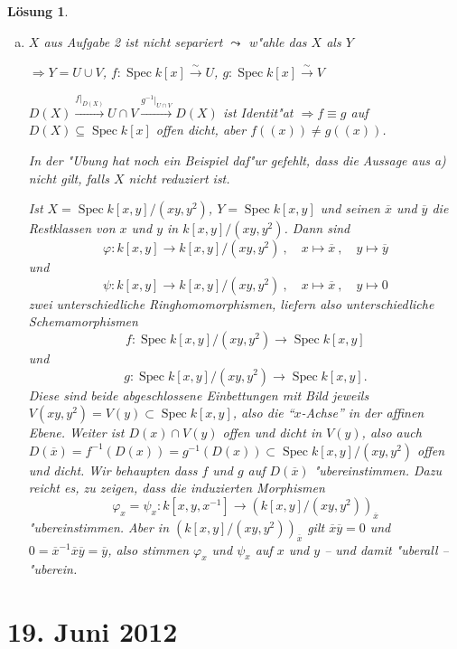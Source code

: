 \documentclass[paper = A4, fontsize=12pt, numbers=noendperiod, chapterprefix=true]{scrbook}
\theoremstyle{break}
\newtheorem{Loes}{L\"osung}
\theoremstyle{nonumberbreak}
\theoremstyle{nonumberplain}
\DeclareMathOperator{\Spec}{Spec}
\begin{document}
\begin{Loes}
\begin{enumerate}[a)]
	$\xRightarrow[\text{Aufg. 1}]{\text{Blatt 4}} \varphi(a) - \psi(a) \in \sqrt 0 \overset{B \text{ red.}}{=} \{0\}$
\item
	$X$ aus Aufgabe 2 ist nicht separiert $\leadsto$ w"ahle das $X$ als $Y$
	
	$\Rightarrow Y = U \cup V$, $f: \Spec k[x] \overset{\sim}{\to} U$, $g: \Spec k[x] \overset{\sim}{\to} V$
	
	$D(X) \xrightarrow{f|_{D(X)}} U \cap V \xrightarrow{g^{-1}|_{U \cap V}} D(X)$ ist Identit"at $\Rightarrow f \equiv g$ auf $D(X) \subseteq \Spec k[x]$ offen dicht, aber $f((x)) \ne g((x))$.
	
	In der "Ubung hat noch ein Beispiel daf"ur gefehlt, dass die Aussage aus a) nicht gilt, falls $X$ nicht reduziert ist.
	
	Ist $X = \Spec k[x,y]/(xy,y^2)$, $Y = \Spec k[x,y]$ und seinen $\overline{x}$ und $\overline{y}$ die Restklassen von $x$ und $y$ in $k[x,y]/(xy,y^2)$. Dann sind
		\[\varphi : k[x,y] \to k[x,y]/(xy,y^2)\ ,\quad x\mapsto \overline{x}\ ,\quad y\mapsto \overline{y}\]
	und
		\[\psi : k[x,y] \to k[x,y]/(xy,y^2)\ ,\quad x\mapsto \overline{x}\ ,\quad y\mapsto 0\]
	zwei unterschiedliche Ringhomomorphismen, liefern also unterschiedliche Schemamorphismen
		\[f: \Spec k[x,y]/(xy,y^2) \to \Spec k[x,y]\]
	und
		\[g: \Spec k[x,y]/(xy,y^2) \to \Spec k[x,y].\]
	Diese sind beide abgeschlossene Einbettungen mit Bild jeweils $V(xy,y^2) = V(y) \subset \Spec k[x,y]$, also die ``$x$-Achse'' in der affinen Ebene. Weiter ist $D(x) \cap V(y)$ offen und dicht in $V(y)$, also auch $D(\overline{x}) = f^{-1}(D(x)) = g^{-1}(D(x)) \subset \Spec k[x,y]/(xy,y^2)$ offen und dicht. Wir behaupten dass $f$ und $g$ auf $D(\overline{x})$ "ubereinstimmen. Dazu reicht es, zu zeigen, dass die induzierten Morphismen
		\[\varphi_{{x}} = \psi_{{x}} : k[x,y,x^{-1}] \to (k[x,y]/(xy,y^2))_{\overline{x}}\]
	"ubereinstimmen. Aber in $(k[x,y]/(xy,y^2))_{\overline{x}}$ gilt $\overline{x}\overline{y} = 0$ und $0 = \overline{x}^{-1}\overline{x}\overline{y} = \overline{y}$, also stimmen $\varphi_x$ und $\psi_x$ auf $x$ und $y$ -- und damit "uberall -- "uberein.
\end{enumerate}

\end{Loes}
 
\newpage
\section{19. Juni 2012}
\setcounter{Aufg}{0}
\setcounter{Loes}{0}
\end{document}

